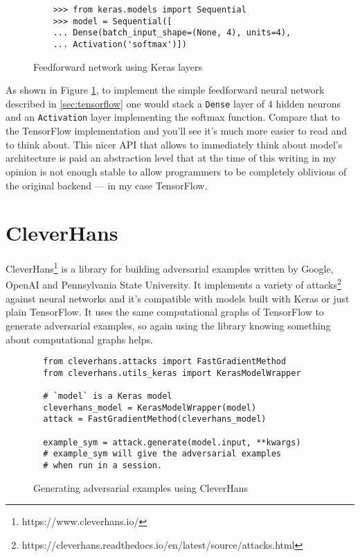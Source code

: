 \begin{figure}
  \begin{verbatim}
    >>> from keras.models import Sequential
    >>> model = Sequential([
    ... Dense(batch_input_shape=(None, 4), units=4),
    ... Activation('softmax')])
  \end{verbatim}
  \caption{Feedforward network using Keras layers}
  \label{fig:feedforward-with-layers}
\end{figure}

As shown in Figure \ref{fig:feedforward-with-layers}, to implement the
simple feedforward neural network described in \ref{sec:tensorflow} one
would stack a \texttt{Dense} layer of 4 hidden neurons and an
\texttt{Activation} layer implementing the softmax function. Compare
that to the TensorFlow implementation and you'll see it's much more
easier to read and to think about. This nicer API that allows
to immediately think about model's architecture is paid an abstraction
level that at the time of this writing in my opinion is not enough
stable to allow programmers to be completely oblivious of the original
backend --- in my case TensorFlow.

\section{CleverHans}
\label{sec:cleverhans}

CleverHans\footnote{https://www.cleverhans.io/} is a library for
building adversarial examples written by Google, OpenAI and
Pennsylvania State University. It implements a variety of
attacks\footnote{https://cleverhans.readthedocs.io/en/latest/source/attacks.html}
against neural networks and it's compatible with models built with
Keras or just plain TensorFlow. It uses the same computational graphs
of TensorFlow to generate adversarial examples, so again using the
library knowing something about computational graphs helps.

\begin{figure}
  \begin{verbatim}
  from cleverhans.attacks import FastGradientMethod
  from cleverhans.utils_keras import KerasModelWrapper

  # `model` is a Keras model
  cleverhans_model = KerasModelWrapper(model)
  attack = FastGradientMethod(cleverhans_model)

  example_sym = attack.generate(model.input, **kwargs)
  # example_sym will give the adversarial examples
  # when run in a session.
  \end{verbatim}
  \caption{Generating adversarial examples using CleverHans}
  \label{fig:cleverhans-attack-dot-generate}
\end{figure}

